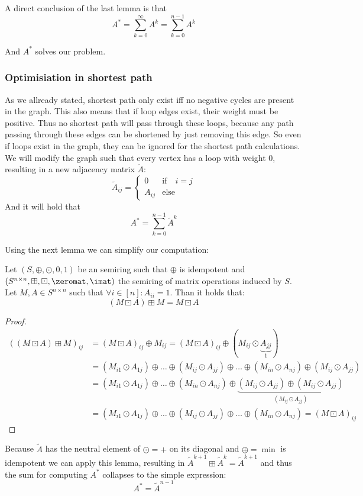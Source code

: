 \begin{corollary}
    A direct conclusion of the last lemma is that
    $$A^* = \sum_{k=0}^{\infty}A^k = \sum_{k=0}^{n-1}A^k$$
\end{corollary}

And $A^*$ solves our problem.

\subsubsection{Optimisiation in shortest path}
As we allready stated, shortest path only exist iff no negative cycles are present in the graph. This also means that if loop edges exist, their weight must be positive. Thus no shortest path will pass through these loops, because any path passing through these edges can be shortened by just removing this edge. So even if loops exist in the graph, they can be ignored for the shortest path calculations. We will modify the graph such that every vertex has a loop with weight 0, resulting in a new adjacency matrix $\tilde A$:
$$\tilde A_{ij} = \begin{cases}
    0  &\textrm{if}\quad i = j\\
    A_{ij} &\textrm{else}
\end{cases}$$
And it will hold that
$$A^* = \sum_{k=0}^{n-1}\tilde A^k$$

Using the next lemma we can simplify our computation:
\begin{lemma}
    Let $(S, \oplus, \odot, 0, 1)$ be an semiring such that $\oplus$ is idempotent and $(S^{n \times n}, \boxplus, \boxdot, \zeromat, \imat)$ the semiring of matrix operations induced by $S$. Let $M, A \in S^{n \times n}$ such that $\forall i \in [n]: A_{ii} = 1$. Than it holds that:
    $$(M \boxdot A) \boxplus M = M \boxdot A$$ 
\end{lemma}
\begin{proof}
    \begin{align*}
        ((M\boxdot A) \boxplus M)_{ij} &= (M\boxdot A)_{ij} \oplus M_{ij} = (M\boxdot A)_{ij} \oplus( M_{ij} \odot \underbrace{A_{jj}}_1)\\
        &= (M_{i1} \odot A_{1j}) \oplus \dots \oplus (M_{ij} \odot A_{jj}) \oplus \dots \oplus (M_{in} \odot A_{nj}) \oplus (M_{ij} \odot A_{jj})\\
        &= (M_{i1} \odot A_{1j}) \oplus \dots \oplus (M_{in} \odot A_{nj}) \oplus \underbrace{(M_{ij} \odot A_{jj}) \oplus (M_{ij} \odot A_{jj})}_{(M_{ij} \odot A_{jj})}\\
        &= (M_{i1} \odot A_{1j}) \oplus \dots \oplus (M_{ij} \odot A_{jj}) \oplus \dots \oplus (M_{in} \odot A_{nj}) = (M \boxdot A)_{ij}
    \end{align*}
\end{proof}
Because $\tilde A$ has the neutral element of $\odot = +$ on its diagonal and $\oplus = \min$ is idempotent we can apply this lemma, resulting in $\tilde A^{k+1} \boxplus \tilde A^k = \tilde A^{k+1}$ and thus the sum for computing $A^*$ collapses to the simple expression:
$$A^* = \tilde A^{n-1}$$

